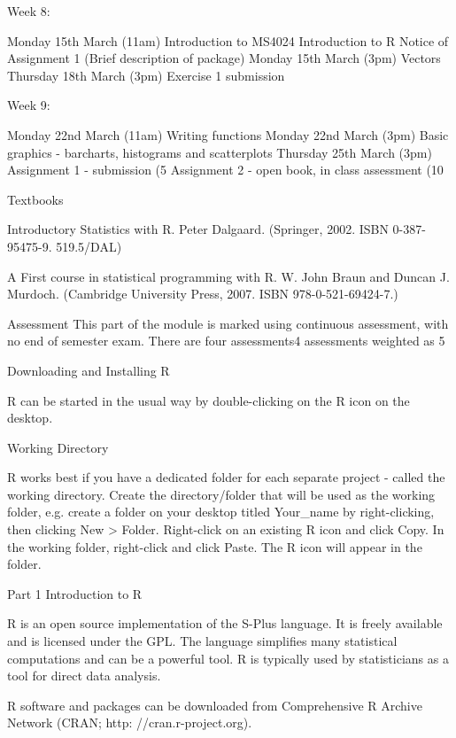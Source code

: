 Week 8:

Monday 15th March (11am)
Introduction to MS4024
Introduction to R
Notice of Assignment 1 (Brief description of package)
Monday 15th March (3pm)
Vectors
Thursday 18th March (3pm)
Exercise 1 submission
	                
 	                   
Week 9: 

Monday 22nd March (11am)
Writing functions
Monday 22nd March (3pm)
Basic graphics - barcharts, histograms and scatterplots
Thursday 25th March  (3pm)
Assignment 1 - submission (5%
Assignment 2 - open book, in class assessment (10%

Textbooks

Introductory Statistics with R. 
Peter Dalgaard. (Springer, 2002. ISBN 0-387-95475-9. 519.5/DAL)

A First course in statistical programming with R. 
W. John Braun and Duncan J. Murdoch. 
(Cambridge University Press, 2007. ISBN 978-0-521-69424-7.)

Assessment
This part of the module is marked using continuous assessment, with no end of semester exam. 
There are four assessments4 assessments weighted as 5%

Downloading and Installing R




R can be started in the usual way by double-clicking on the R icon on the desktop.

Working Directory

R works best if you have a dedicated folder for each separate project - called the working directory.
 Create the directory/folder that will be used as the working folder, e.g. create a folder on your desktop titled Your_name
by right-clicking, then clicking New > Folder.
  Right-click on an existing R icon and click Copy.
  In the working folder, right-click and click Paste. 
The R icon will appear in the folder.


 

	     
Part 1 Introduction to R

R is an open source implementation of the S-Plus language. It is freely available and is licensed under the GPL. The language simplifies many statistical computations and can be a powerful tool. R is typically used by statisticians as a tool for direct data analysis.


R software and packages can be downloaded from Comprehensive R Archive Network (CRAN; http: //cran.r-project.org).
 
